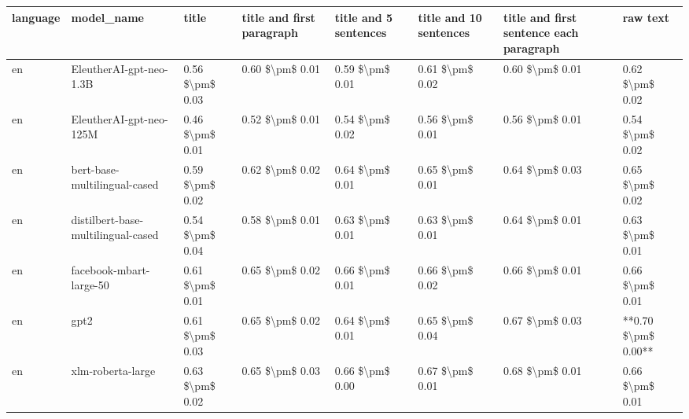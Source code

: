 \begin{tabular}{llllllll}
\toprule
language &                         model\_name &           title & title and first paragraph & title and 5 sentences & title and 10 sentences & title and first sentence each paragraph &            raw text \\
\midrule
      en &            EleutherAI-gpt-neo-1.3B & 0.56 \$\textbackslash pm\$ 0.03 &           0.60 \$\textbackslash pm\$ 0.01 &       0.59 \$\textbackslash pm\$ 0.01 &        0.61 \$\textbackslash pm\$ 0.02 &                         0.60 \$\textbackslash pm\$ 0.01 &     0.62 \$\textbackslash pm\$ 0.02 \\
      en &            EleutherAI-gpt-neo-125M & 0.46 \$\textbackslash pm\$ 0.01 &           0.52 \$\textbackslash pm\$ 0.01 &       0.54 \$\textbackslash pm\$ 0.02 &        0.56 \$\textbackslash pm\$ 0.01 &                         0.56 \$\textbackslash pm\$ 0.01 &     0.54 \$\textbackslash pm\$ 0.02 \\
      en &       bert-base-multilingual-cased & 0.59 \$\textbackslash pm\$ 0.02 &           0.62 \$\textbackslash pm\$ 0.02 &       0.64 \$\textbackslash pm\$ 0.01 &        0.65 \$\textbackslash pm\$ 0.01 &                         0.64 \$\textbackslash pm\$ 0.03 &     0.65 \$\textbackslash pm\$ 0.02 \\
      en & distilbert-base-multilingual-cased & 0.54 \$\textbackslash pm\$ 0.04 &           0.58 \$\textbackslash pm\$ 0.01 &       0.63 \$\textbackslash pm\$ 0.01 &        0.63 \$\textbackslash pm\$ 0.01 &                         0.64 \$\textbackslash pm\$ 0.01 &     0.63 \$\textbackslash pm\$ 0.01 \\
      en &            facebook-mbart-large-50 & 0.61 \$\textbackslash pm\$ 0.01 &           0.65 \$\textbackslash pm\$ 0.02 &       0.66 \$\textbackslash pm\$ 0.01 &        0.66 \$\textbackslash pm\$ 0.02 &                         0.66 \$\textbackslash pm\$ 0.01 &     0.66 \$\textbackslash pm\$ 0.01 \\
      en &                               gpt2 & 0.61 \$\textbackslash pm\$ 0.03 &           0.65 \$\textbackslash pm\$ 0.02 &       0.64 \$\textbackslash pm\$ 0.01 &        0.65 \$\textbackslash pm\$ 0.04 &                         0.67 \$\textbackslash pm\$ 0.03 & **0.70 \$\textbackslash pm\$ 0.00** \\
      en &                  xlm-roberta-large & 0.63 \$\textbackslash pm\$ 0.02 &           0.65 \$\textbackslash pm\$ 0.03 &       0.66 \$\textbackslash pm\$ 0.00 &        0.67 \$\textbackslash pm\$ 0.01 &                         0.68 \$\textbackslash pm\$ 0.01 &     0.66 \$\textbackslash pm\$ 0.01 \\

\end{tabular}
